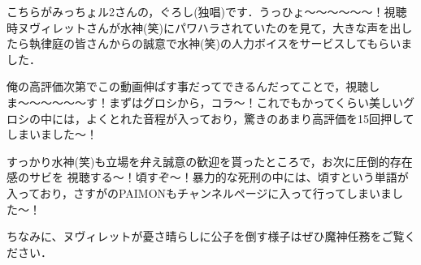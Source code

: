 \documentclass[main]{subfiles}
\begin{document}
こちらがみっちょル2さんの，ぐろし(独唱)です．うっひょ〜〜〜～～～！視聴時ヌヴィレットさんが水神(笑)にパワハラされていたのを見て，大きな声を出したら執律庭の皆さんからの誠意で水神(笑)の人力ボイスをサービスしてもらいました．

俺の高評価次第でこの動画伸ばす事だってできるんだってことで，視聴しま〜〜〜～～～す！まずはグロシから，コラ〜！これでもかってくらい美しいグロシの中には，よくとれた音程が入っており，驚きのあまり高評価を15回押してしまいました〜！

すっかり水神(笑)も立場を弁え誠意の歓迎を貰ったところで，お次に圧倒的存在感のサビを
視聴する〜！頃すぞ〜！暴力的な死刑の中には、頃すという単語が入っており，さすがのPAIMONもチャンネルページに入って行ってしまいました〜！

ちなみに、ヌヴィレットが憂さ晴らしに公子を倒す様子はぜひ魔神任務をご覧ください．
\end{document}
